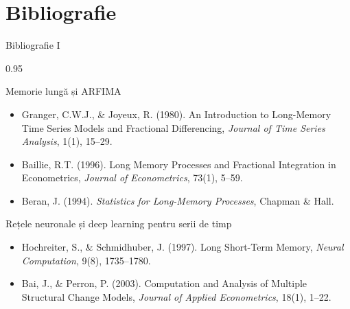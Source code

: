 \documentclass[9pt, aspectratio=169, t]{beamer}
\begin{document}
\section{Bibliografie}

\begin{frame}{Bibliografie I}
    \vspace{-0.3cm}
    \begin{cminipage}{0.95\textwidth}
        \begin{block}{Memorie lungă și ARFIMA}
            {\small
            \begin{itemize}\setlength{\itemsep}{0pt}
                \item Granger, C.W.J., \& Joyeux, R. (1980). An Introduction to Long-Memory Time Series Models and Fractional Differencing, \textit{Journal of Time Series Analysis}, 1(1), 15--29.
                \item Baillie, R.T. (1996). Long Memory Processes and Fractional Integration in Econometrics, \textit{Journal of Econometrics}, 73(1), 5--59.
                \item Beran, J. (1994). \textit{Statistics for Long-Memory Processes}, Chapman \& Hall.
            \end{itemize}
            }
        \end{block}

        \begin{exampleblock}{Rețele neuronale și deep learning pentru serii de timp}
            {\small
            \begin{itemize}\setlength{\itemsep}{0pt}
                \item Hochreiter, S., \& Schmidhuber, J. (1997). Long Short-Term Memory, \textit{Neural Computation}, 9(8), 1735--1780.
                \item Bai, J., \& Perron, P. (2003). Computation and Analysis of Multiple Structural Change Models, \textit{Journal of Applied Econometrics}, 18(1), 1--22.
            \end{itemize}
            }
        \end{exampleblock}
    \end{cminipage}
\end{frame}
\end{document}
